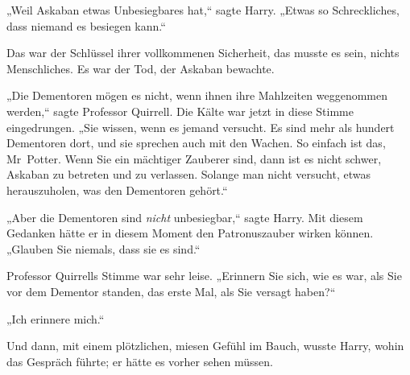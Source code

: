 „Weil Askaban etwas Unbesiegbares hat,“ sagte Harry. „Etwas so Schreckliches, dass niemand es besiegen kann.“

Das war der Schlüssel ihrer vollkommenen Sicherheit, das musste es sein, nichts Menschliches. Es war der Tod, der Askaban bewachte.

„Die Dementoren mögen es nicht, wenn ihnen ihre Mahlzeiten weggenommen werden,“ sagte Professor Quirrell. Die Kälte war jetzt in diese Stimme eingedrungen. „Sie wissen, wenn es jemand versucht. Es sind mehr als hundert Dementoren dort, und sie sprechen auch mit den Wachen. So einfach ist das, Mr~Potter. Wenn Sie ein mächtiger Zauberer sind, dann ist es nicht schwer, Askaban zu betreten und zu verlassen. Solange man nicht versucht, etwas herauszuholen, was den Dementoren gehört.“

„Aber die Dementoren sind \emph{nicht} unbesiegbar,“ sagte Harry. Mit diesem Gedanken hätte er in diesem Moment den Patronuszauber wirken können. „Glauben Sie niemals, dass sie es sind.“

Professor Quirrells Stimme war sehr leise. „Erinnern Sie sich, wie es war, als Sie vor dem Dementor standen, das erste Mal, als Sie versagt haben?“

„Ich erinnere mich.“

Und dann, mit einem plötzlichen, miesen Gefühl im Bauch, wusste Harry, wohin das Gespräch führte; er hätte es vorher sehen müssen.

